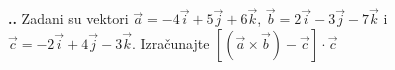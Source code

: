 
\noindent 
\textbf{
\thecjelina.\thezadatak.}
Zadani su vektori $\vec{a}=-4\vec{i}+5\vec{j}+6\vec{k}$,  $\vec{b} = 2\vec{i}-3\vec{j}-7\vec{k}$ i $\vec{c}=-2\vec{i}+4\vec{j}-3\vec{k}$. Izračunajte $[ (\vec{a}\times\vec{b})-\vec{c} ]\cdot\vec{c}$
